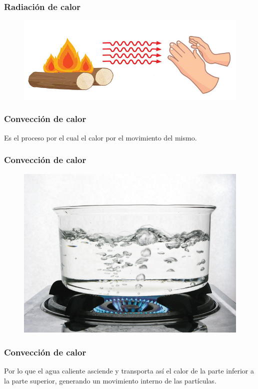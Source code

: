 \documentclass[14pt]{beamer}
\begin{document}
\begin{frame}
\frametitle{Radiación de calor}
\begin{figure}
    \centering
    \includegraphics[scale=0.5]{Imagenes/Calor_02.png}
\end{figure}
\end{frame}
\begin{frame}
\frametitle{Convección de calor}
Es el proceso por el cual el calor  por el movimiento del mismo.
\end{frame}
\begin{frame}
\frametitle{Convección de calor}
\begin{figure}
    \centering
    \includegraphics[scale=0.25]{Imagenes/Calor_01.jpg}
\end{figure}
\end{frame}
\begin{frame}
\frametitle{Convección de calor}
Por lo que el agua caliente asciende y transporta así el calor de la parte inferior a la parte superior, \pause generando un movimiento interno de las partículas.
\end{frame}
\end{document}
